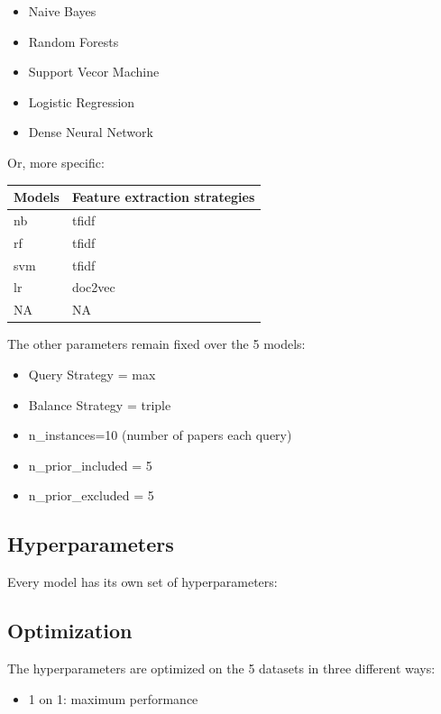 \documentclass[
]{book}
\providecommand{\tightlist}{%
  \setlength{\itemsep}{0pt}\setlength{\parskip}{0pt}}
\begin{document}
\begin{itemize}
\tightlist
\item
  Naive Bayes
\item
  Random Forests
\item
  Support Vecor Machine
\item
  Logistic Regression
\item
  Dense Neural Network
\end{itemize}

Or, more specific:

\begin{tabular}{ll}
\toprule
Models & Feature extraction strategies\\
\midrule
nb & tfidf\\
rf & tfidf\\
svm & tfidf\\
lr & doc2vec\\
NA & NA\\
\bottomrule
\end{tabular}

The other parameters remain fixed over the 5 models:

\begin{itemize}
\tightlist
\item
  Query Strategy = max
\item
  Balance Strategy = triple
\item
  n\_instances=10 (number of papers each query)
\item
  n\_prior\_included = 5
\item
  n\_prior\_excluded = 5
\end{itemize}

\hypertarget{hyperparameters}{%
\subsection{Hyperparameters}\label{hyperparameters}}

Every model has its own set of hyperparameters:

\hypertarget{optimization}{%
\subsection{Optimization}\label{optimization}}

The hyperparameters are optimized on the 5 datasets in three different ways:

\begin{itemize}
\tightlist
\item
  1 on 1: maximum performance
\end{itemize}
\end{document}
